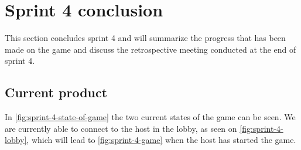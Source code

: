 \section{Sprint 4 conclusion}\label{sec:sprint4conclusion}
This section concludes sprint 4 and will summarize the progress that has been made on the game and discuss the retrospective meeting conducted at the end of sprint 4.

\subsection{Current product}
In \autoref{fig:sprint-4-state-of-game} the two current states of the game can be seen.
We are currently able to connect to the host in the lobby, as seen on \autoref{fig:sprint-4-lobby}, which will lead to \autoref{fig:sprint-4-game} when the host has started the game.
